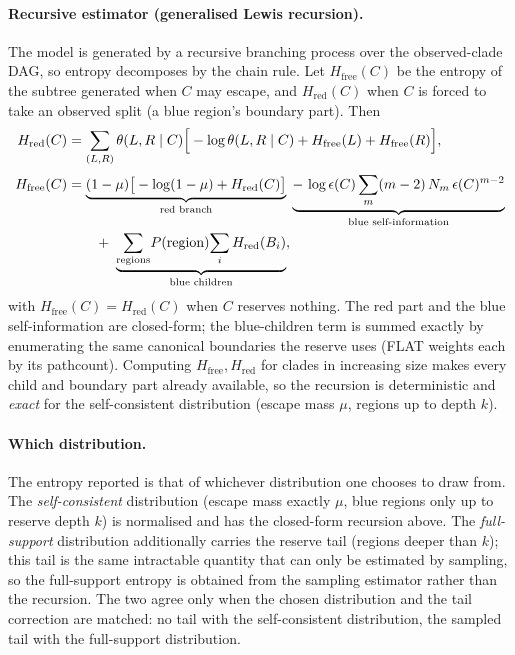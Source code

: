 \documentclass{article}
\newcommand{\Hred}{H_{\mathrm{red}}}
\newcommand{\Hfree}{H_{\mathrm{free}}}
\newcommand{\eps}{\epsilon}
\begin{document}
\paragraph{Recursive estimator (generalised Lewis recursion).}
The model is generated by a recursive branching process over the observed-clade
DAG, so entropy decomposes by the chain rule. Let $\Hfree(C)$ be the entropy of
the subtree generated when $C$ may escape, and $\Hred(C)$ when $C$ is forced to
take an observed split (a blue region's boundary part). Then
\begin{align}
  \Hred(C) &= \sum_{(L,R)}\theta(L,R\mid C)\Big[-\log\theta(L,R\mid C)
              +\Hfree(L)+\Hfree(R)\Big],\\[2pt]
  \Hfree(C) &= \underbrace{(1-\mu)\big[-\log(1-\mu)+\Hred(C)\big]}_{\text{red branch}}
   \;\underbrace{-\,\log\eps(C)\sum_{m}(m-2)\,N_m\,\eps(C)^{m-2}}_{\text{blue self-information}} \notag\\
   &\qquad +\;\underbrace{\sum_{\text{regions}}\!P(\text{region})\!\sum_i \Hred(B_i)}_{\text{blue children}} ,
\end{align}
with $\Hfree(C)=\Hred(C)$ when $C$ reserves nothing. The red part and the blue
self-information are closed-form; the blue-children term is summed exactly by
enumerating the same canonical boundaries the reserve uses (FLAT weights each by
its pathcount). Computing $\Hfree,\Hred$ for clades in increasing size makes every
child and boundary part already available, so the recursion is deterministic and
\emph{exact} for the self-consistent distribution (escape mass $\mu$, regions up
to depth $k$).

\paragraph{Which distribution.}
The entropy reported is that of whichever distribution one chooses to draw from.
The \emph{self-consistent} distribution (escape mass exactly $\mu$, blue regions
only up to reserve depth $k$) is normalised and has the closed-form recursion
above. The \emph{full-support} distribution additionally carries the reserve tail
(regions deeper than $k$); this tail is the same intractable quantity that can
only be estimated by sampling, so the full-support entropy is obtained from the
sampling estimator rather than the recursion. The two agree only when the chosen
distribution and the tail correction are matched: no tail with the self-consistent
distribution, the sampled tail with the full-support distribution.
\end{document}
